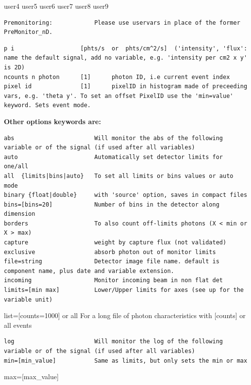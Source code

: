 user4 user5 user6 user7 user8 user9

\begin{verbatim}
Premonitoring:            Please use uservars in place of the former PreMonitor_nD.
\end{verbatim}

\begin{verbatim}
p i                   [phts/s  or  phts/cm^2/s]  ('intensity', 'flux': name the default signal, add no variable, e.g. 'intensity per cm2 x y' is 2D)
ncounts n photon      [1]      photon ID, i.e current event index
pixel id              [1]      pixelID in histogram made of preceeding vars, e.g. 'theta y'. To set an offset PixelID use the 'min=value' keyword. Sets event mode.
\end{verbatim}

\textbf{Other options keywords are:}

\begin{verbatim}
abs                       Will monitor the abs of the following variable or of the signal (if used after all variables)
auto                      Automatically set detector limits for one/all
all  {limits|bins|auto}   To set all limits or bins values or auto mode
binary {float|double}     with 'source' option, saves in compact files
bins=[bins=20]            Number of bins in the detector along dimension
borders                   To also count off-limits photons (X < min or X > max)
capture                   weight by capture flux (not validated)
exclusive                 absorb photon out of monitor limits
file=string               Detector image file name. default is component name, plus date and variable extension.
incoming                  Monitor incoming beam in non flat det
limits=[min max]          Lower/Upper limits for axes (see up for the variable unit)
\end{verbatim}

list=[counts=1000] or all For a long file of photon characteristics with [counts] or all events

\begin{verbatim}
log                       Will monitor the log of the following variable or of the signal (if used after all variables)
min=[min_value]           Same as limits, but only sets the min or max
\end{verbatim}

max=[max\_value]

